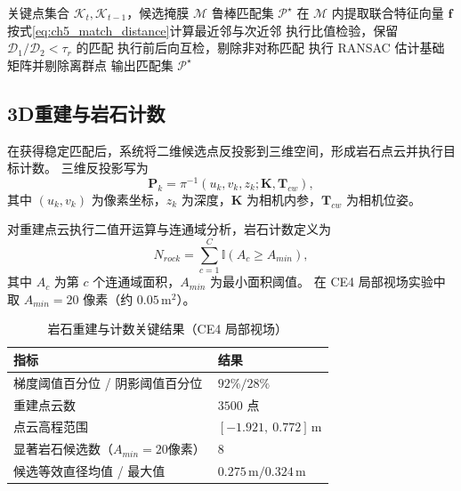 \begin{algorithm}[H]
\caption{岩石特征匹配流程}
\label{alg:ch5_rock_matching}
\begin{algorithmic}[1]
\REQUIRE 关键点集合 $\mathcal{K}_t,\mathcal{K}_{t-1}$，候选掩膜 $\mathcal{M}$
\ENSURE 鲁棒匹配集 $\mathcal{P}^\star$
\STATE 在 $\mathcal{M}$ 内提取联合特征向量 $\mathbf{f}$
\STATE 按式\eqref{eq:ch5_match_distance}计算最近邻与次近邻
\STATE 执行比值检验，保留 $\mathcal{D}_1/\mathcal{D}_2<\tau_r$ 的匹配
\STATE 执行前后向互检，剔除非对称匹配
\STATE 执行 RANSAC 估计基础矩阵并剔除离群点
\STATE 输出匹配集 $\mathcal{P}^\star$
\end{algorithmic}
\end{algorithm}

\subsection{3D重建与岩石计数}
\label{subsec:ch5_reconstruction_counting}

在获得稳定匹配后，系统将二维候选点反投影到三维空间，形成岩石点云并执行目标计数。
三维反投影写为
\begin{equation}
\mathbf{P}_k=\pi^{-1}\!\left(u_k,v_k,z_k;\mathbf{K},\mathbf{T}_{cw}\right),
\label{eq:ch5_back_project}
\end{equation}
其中 $(u_k,v_k)$ 为像素坐标，$z_k$ 为深度，$\mathbf{K}$ 为相机内参，$\mathbf{T}_{cw}$ 为相机位姿。

对重建点云执行二值开运算与连通域分析，岩石计数定义为
\begin{equation}
N_{rock}=\sum_{c=1}^{C}\mathbb{I}(A_c\ge A_{min}),
\label{eq:ch5_counting}
\end{equation}
其中 $A_c$ 为第 $c$ 个连通域面积，$A_{min}$ 为最小面积阈值。
在 CE4 局部视场实验中取 $A_{min}=20$ 像素（约 $0.05\,\mathrm{m}^2$）。

\begin{table}[H]
	\centering
	\small
	\caption{岩石重建与计数关键结果（CE4 局部视场）}
	\label{tab:ch5_reconstruction_metrics}
	\begin{tabular}{p{}p{}}
		\toprule
		指标 & 结果 \\
		\midrule
		梯度阈值百分位 / 阴影阈值百分位 & $92\% / 28\%$ \\
		重建点云数 & $3500$ 点 \\
		点云高程范围 & $[-1.921,\ 0.772]\,\mathrm{m}$ \\
		显著岩石候选数（$A_{min}=20$像素） & $8$ \\
		候选等效直径均值 / 最大值 & $0.275\,\mathrm{m} / 0.324\,\mathrm{m}$ \\
		\bottomrule
	\end{tabular}
\end{table}

